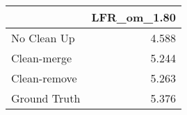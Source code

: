 \begin{tabular}{lr}
\toprule
{} & LFR_om_1.80 \\
\midrule
No Clean Up  &       4.588 \\
Clean-merge  &       5.244 \\
Clean-remove &       5.263 \\
Ground Truth &       5.376 \\
\bottomrule
\end{tabular}
